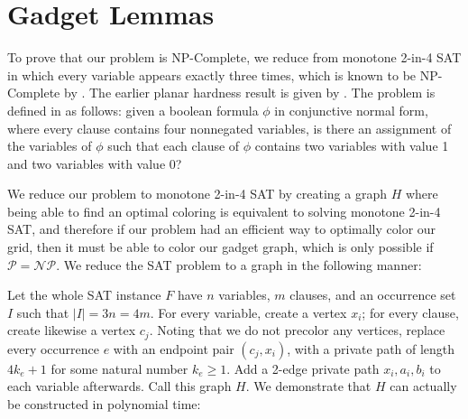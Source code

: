 \documentclass[11pt]{article}
\theoremstyle{plain}
\begin{document}
\section{Gadget Lemmas}

To prove that our problem is NP-Complete, we reduce from monotone 2-in-4 SAT in which every variable appears exactly three times, which is known to be NP-Complete by \citet [Theorem~21, p.~337]{scheffler2022distance}. The earlier planar hardness result is given by \citet[Lemma~3]{KaraKratochvilWood2007}. The problem is defined in \cite {scheffler2022distance} as follows: given a boolean formula $\phi$ in conjunctive normal form, where every clause contains four nonnegated variables, is there an assignment of the variables of $\phi$ such that each clause of $\phi$ contains two variables with value 1 and two variables with value 0?

We reduce our problem to monotone 2-in-4 SAT by creating a graph $H$ where being able to find an optimal coloring is equivalent to solving monotone 2-in-4 SAT, and therefore if our problem had an efficient way to optimally color our grid, then it must be able to color our gadget graph, which is only possible if $\mathcal{P} = \mathcal{NP}$. We reduce the SAT problem to a graph in the following manner:

Let the whole SAT instance $F$ have $n$ variables, $m$ clauses, and an occurrence set $I$ such that $|I| = 3n = 4m$. For every variable, create a vertex $x_i$; for every clause, create likewise a vertex $c_j$. Noting that we do not precolor any vertices, replace every occurrence $e$ with an endpoint pair $(c_j, x_i)$, with a private path of length $4k_e + 1$ for some natural number $k_e \geq 1$. Add a 2-edge private path $x_i, a_i, b_i$ to each variable afterwards. Call this graph $H$. We demonstrate that $H$ can actually be constructed in polynomial time:
\end{document}

